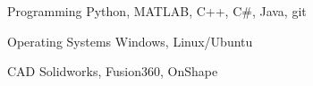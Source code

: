 

\begin{cvskills}

    \cvskill
      {Programming} %
      {Python, MATLAB, C++, C\#, Java, git} %
  
    \cvskill
      {Operating Systems} %
      {Windows, Linux/Ubuntu} %
  
    \cvskill
      {CAD} %
      {Solidworks, Fusion360, OnShape} %

  \end{cvskills}